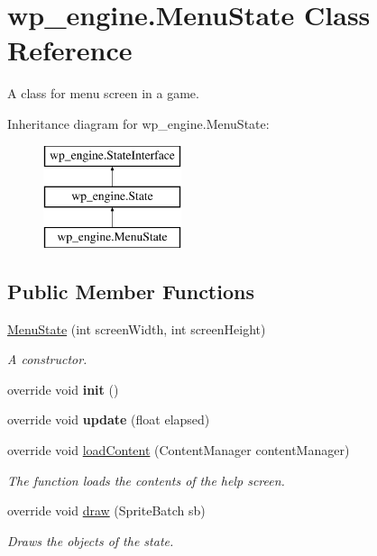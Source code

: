 \hypertarget{classwp__engine_1_1_menu_state}{\section{wp\-\_\-engine.\-Menu\-State Class Reference}
\label{classwp__engine_1_1_menu_state}
}


A class for menu screen in a game.  


Inheritance diagram for wp\-\_\-engine.\-Menu\-State\-:\begin{figure}[H]
\begin{center}
\leavevmode
\includegraphics[height=3.000000cm]{classwp__engine_1_1_menu_state}
\end{center}
\end{figure}
\subsection*{Public Member Functions}
\begin{DoxyCompactItemize}
\item 
\hyperlink{classwp__engine_1_1_menu_state_a3d7c512948af3f51851890877d624df2}{Menu\-State} (int screen\-Width, int screen\-Height)
\begin{DoxyCompactList}\small\item\em A constructor. \end{DoxyCompactList}\item 
\hypertarget{classwp__engine_1_1_menu_state_ac621e5563b5e2332108f84945850ee1f}{override void {\bfseries init} ()}\label{classwp__engine_1_1_menu_state_ac621e5563b5e2332108f84945850ee1f}

\item 
\hypertarget{classwp__engine_1_1_menu_state_a39163feefdcb3ac49064c797ab112589}{override void {\bfseries update} (float elapsed)}\label{classwp__engine_1_1_menu_state_a39163feefdcb3ac49064c797ab112589}

\item 
override void \hyperlink{classwp__engine_1_1_menu_state_a3f2d385fae71f22cfa0dc432b4e90603}{load\-Content} (Content\-Manager content\-Manager)
\begin{DoxyCompactList}\small\item\em The function loads the contents of the help screen. \end{DoxyCompactList}\item 
override void \hyperlink{classwp__engine_1_1_menu_state_a59383f25558f805eca08fe6ac0ca70cd}{draw} (Sprite\-Batch sb)
\begin{DoxyCompactList}\small\item\em Draws the objects of the state. \end{DoxyCompactList}\end{DoxyCompactItemize}
